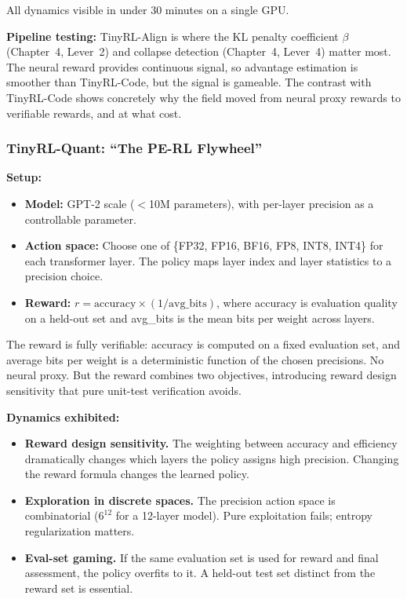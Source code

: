 All dynamics visible in under 30 minutes on a single GPU.

\textbf{Pipeline testing:} TinyRL-Align is where the KL penalty coefficient $\beta$ (Chapter~4, Lever~2) and collapse detection (Chapter~4, Lever~4) matter most. The neural reward provides continuous signal, so advantage estimation is smoother than TinyRL-Code, but the signal is gameable. The contrast with TinyRL-Code shows concretely why the field moved from neural proxy rewards to verifiable rewards, and at what cost.


\subsubsection*{TinyRL-Quant: ``The PE-RL Flywheel''}

\textbf{Setup:}
\begin{itemize}
  \item \textbf{Model:} GPT-2 scale ($<$10M parameters), with per-layer precision as a controllable parameter.
  \item \textbf{Action space:} Choose one of \{FP32, FP16, BF16, FP8, INT8, INT4\} for each transformer layer. The policy maps layer index and layer statistics to a precision choice.
  \item \textbf{Reward:} $r = \text{accuracy} \times (1 / \text{avg\_bits})$, where accuracy is evaluation quality on a held-out set and avg\_bits is the mean bits per weight across layers.
\end{itemize}

The reward is fully verifiable: accuracy is computed on a fixed evaluation set, and average bits per weight is a deterministic function of the chosen precisions. No neural proxy. But the reward combines two objectives, introducing reward design sensitivity that pure unit-test verification avoids.

\textbf{Dynamics exhibited:}
\begin{itemize}
  \item \textbf{Reward design sensitivity.} The weighting between accuracy and efficiency dramatically changes which layers the policy assigns high precision. Changing the reward formula changes the learned policy.
  \item \textbf{Exploration in discrete spaces.} The precision action space is combinatorial ($6^{12}$ for a 12-layer model). Pure exploitation fails; entropy regularization matters.
  \item \textbf{Eval-set gaming.} If the same evaluation set is used for reward and final assessment, the policy overfits to it. A held-out test set distinct from the reward set is essential.
\end{itemize}

